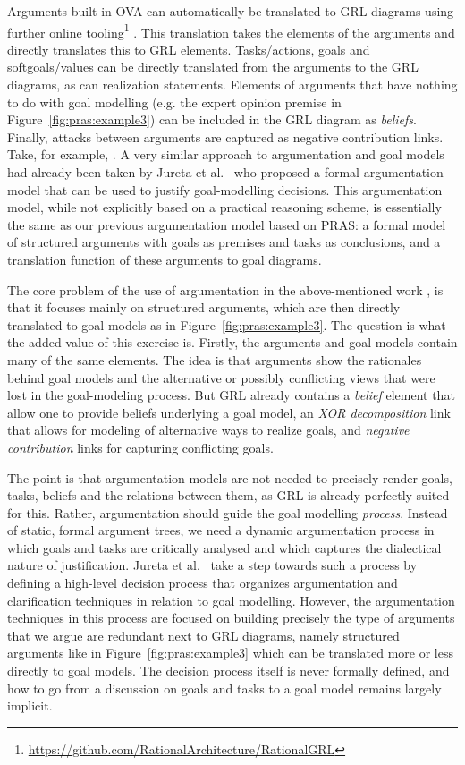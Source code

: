 Arguments built in OVA can automatically be translated to GRL diagrams using further online tooling\footnote{\url{https://github.com/RationalArchitecture/RationalGRL}} \cite{vanZee-etal:comma2016}. This translation takes the elements of the arguments and directly translates this to GRL elements. Tasks/actions, goals and softgoals/values can be directly translated from the arguments to the GRL diagrams, as can realization statements. Elements of arguments that have nothing to do with goal modelling (e.g. the expert opinion premise in Figure~\ref{fig:pras:example3}) can be included in the GRL diagram as \emph{beliefs}. Finally, attacks between arguments are captured as negative contribution links. Take, for example, . A very similar approach to argumentation and goal models had already been taken by Jureta et al.~\cite{Jureta:RE2008} who proposed a formal argumentation model that can be used to justify goal-modelling decisions. This argumentation model, while not explicitly based on a practical reasoning scheme, is essentially the same as our previous argumentation model based on PRAS: a formal model of structured arguments with goals as premises and tasks as conclusions, and a translation function of these arguments to goal diagrams. 

The core problem of the use of argumentation in the above-mentioned work \cite{Jureta:RE2008,vanzee-etal:renext2015,vanZee-etal:er2016}, is that it focuses mainly on structured arguments, which are then directly translated to goal models as in Figure~\ref{fig:pras:example3}. The question is what the added value of this exercise is. Firstly, the arguments and goal models contain many of the same elements. The idea is that arguments show the rationales behind goal models and the alternative or possibly conflicting views that were lost in the goal-modeling process. But GRL already contains a \emph{belief} element that allow one to provide beliefs underlying a goal model, an \emph{XOR decomposition} link that allows for modeling of alternative ways to realize goals, and \emph{negative contribution} links for capturing conflicting goals. 

The point is that argumentation models are not needed to precisely render goals, tasks, beliefs and the relations between them, as GRL is already perfectly suited for this. Rather, argumentation should guide the goal modelling \emph{process}. Instead of static, formal argument trees, we need a dynamic argumentation process in which goals and tasks are critically analysed and which captures the dialectical nature of justification. Jureta et al.~\cite{Jureta:RE2008} take a step towards such a process by defining a high-level decision process that organizes argumentation and clarification techniques in relation to goal modelling. However, the argumentation techniques in this process are focused on building precisely the type of arguments that we argue are redundant next to GRL diagrams, namely structured arguments like in Figure~\ref{fig:pras:example3} which can be translated more or less directly to goal models. The decision process itself is never formally defined, and how to go from a discussion on goals and tasks to a goal model remains largely implicit. 

